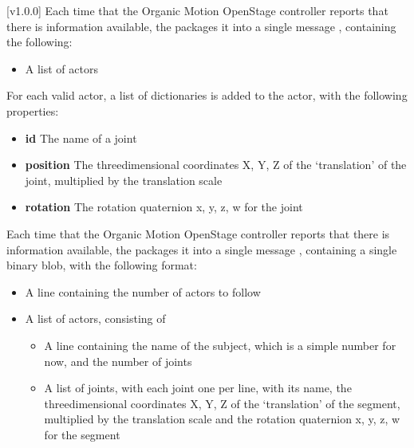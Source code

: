 [v1.0.0]
Each time that the Organic Motion OpenStage controller reports that there is information
available, the  packages it into a single message
\openSq{}\closeSq, containing the following:
\begin{itemize}
\item A list of actors
\end{itemize}

For each valid actor, a list of dictionaries is added to the actor, with the following
properties:
\begin{itemize}
\item\textbf{id} The name of a joint
\item\exSp\textbf{position} The three\longDash{}dimensional coordinates \openSq{}X, Y,
Z\closeSq{} of the `translation' of the joint, multiplied by the translation scale
\item\exSp\textbf{rotation} The rotation quaternion \openSq{}x, y, z, w\closeSq{} for the
joint
\end{itemize}
\primaryEnd{}
Each time that the Organic Motion OpenStage controller reports that there is information
available, the  packages it into a single message
\openSq{}\closeSq, containing a single binary blob, with the following
format:
\begin{itemize}
\item A line containing the number of actors to follow
\item\exSp{}A list of actors, consisting of
\begin{itemize}
\item A line containing the name of the subject, which is a simple number for now, and the
number of joints
\item\exSp{}A list of joints, with each joint one per line, with its name, the
three\longDash{}dimensional coordinates \openSq{}X, Y, Z\closeSq{} of the `translation'
of the segment, multiplied by the translation scale and the rotation quaternion
\openSq{}x, y, z, w\closeSq{} for the segment
\end{itemize}
\end{itemize}
\primaryEnd{}
